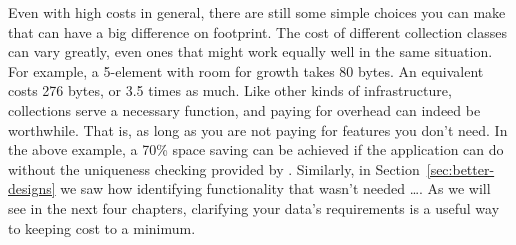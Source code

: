 

Even with high costs in general, there are still some simple choices
you can make that can have a big difference on footprint. The cost of different
collection classes can vary greatly, even ones that might work equally well in the same
situation. For example, a 5-element  with room for growth takes
80 bytes. An equivalent  costs 276 bytes, or 3.5 times as much.
Like other kinds of infrastructure, collections serve a necessary
function, and paying for overhead can indeed be worthwhile. That is, as long as
you are not paying for features you don't need. In the above example, a
70\% space saving can be achieved if the application can do without the uniqueness checking provided by
.  Similarly, in Section~\ref{sec:better-designs} we saw how
identifying functionality that wasn't needed \ldots. As we
will see in the next four chapters, clarifying your data's requirements is a
useful way to keeping cost to a minimum.


  
